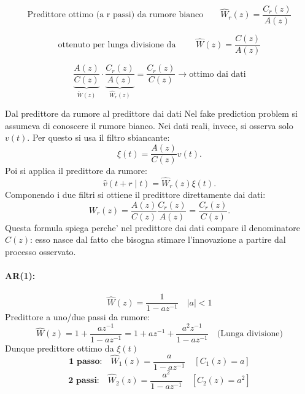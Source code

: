 \documentclass[11pt,a4paper]{article}
\begin{document}
\[
\text{Predittore ottimo (a r passi) da rumore bianco}\qquad
\hat W_r(z)=\frac{C_r(z)}{A(z)}
\]

\[
\text{ottenuto per lunga divisione da }\qquad
\hat W(z)=\frac{C(z)}{A(z)}
\]

\begin{center}
\end{center}

\vspace{1em}

\begin{center}
\end{center}

\[
\underbrace{\frac{A(z)}{C(z)}}_{{\check W(z)}}
\cdot
\underbrace{\frac{C_r(z)}{A(z)}}_{\hat W_r(z)}
=
\frac{C_r(z)}{C(z)} \rightarrow \text{ottimo dai dati}
\]

\begin{spiegazione}{Dal predittore da rumore al predittore dai dati}
Nel fake prediction problem si assumeva di conoscere il rumore bianco. Nei dati reali, invece, si osserva solo $v(t)$. Per questo si usa il filtro sbiancante:
\[
\xi(t)=\frac{A(z)}{C(z)}v(t).
\]
Poi si applica il predittore da rumore:
\[
\hat v(t+r\mid t)=\hat W_r(z)\xi(t).
\]
Componendo i due filtri si ottiene il predittore direttamente dai dati:
\[
W_r(z)=\frac{A(z)}{C(z)}\frac{C_r(z)}{A(z)}=\frac{C_r(z)}{C(z)}.
\]
Questa formula spiega perche' nel predittore dai dati compare il denominatore $C(z)$: esso nasce dal fatto che bisogna stimare l'innovazione a partire dal processo osservato.
\end{spiegazione}

\paragraph{AR(1):}
\[
\hat W(z) = \frac{1}{1-az^{-1}} \quad |a|<1
\]
Predittore a uno/due passi da rumore:
\[
\hat W(z) = 1+\frac{az^{-1}}{1-az^{-1}} = 1+az^{-1}+\frac{a^2z^{-1}}{1-az^{-1}} \quad (\text{Lunga divisione)}
\]
Dunque predittore ottimo da $\xi(t)$
\[
\textbf{1 passo:} \quad \hat W_1(z) =\frac{a}{1-az^{-1}} \quad [C_1(z) =a]
\]
\[
\textbf{2 passi:} \quad \hat W_2(z) = \frac{a^2}{1-az^{-1}} \quad [C_2(z)=a^2]
\]
\end{document}
